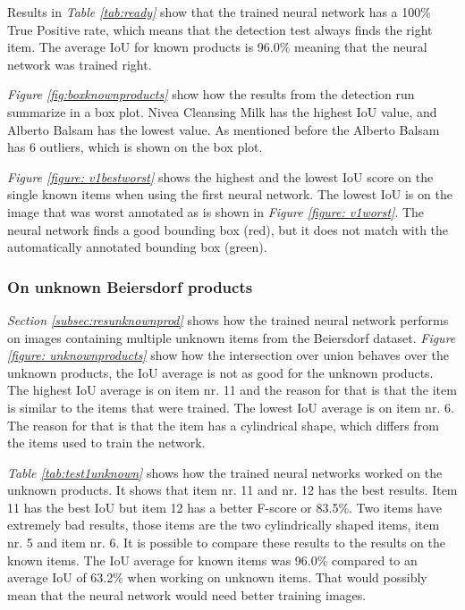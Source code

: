 Results in \textit{Table \ref{tab:ready}} show that the trained neural network has a 100\% True Positive rate, which means that the detection test always finds the right item. The average IoU for known products is 96.0\% meaning that the neural network was trained right.

\textit{Figure \ref{fig:boxknownproducts}} show how the results from the detection run summarize in a box plot. Nivea Cleansing Milk has the highest IoU value, and Alberto Balsam has the lowest value. As mentioned before the Alberto Balsam has 6 outliers, which is shown on the box plot.

\textit{Figure \ref{figure: v1bestworst}} shows the highest and the lowest IoU score on the single known items when using the first neural network. The lowest IoU is on the image that was worst annotated as is shown in \textit{Figure \ref{figure: v1worst}}. The neural network finds a good bounding box (red), but it does not match with the automatically annotated bounding box (green).

\subsubsection{On unknown Beiersdorf products}
\textit{Section \ref{subsec:resunknownprod}} shows how the trained neural network performs on images containing multiple unknown items from the Beiersdorf dataset. \textit{Figure \ref{figure: unknownproducts}} show how the intersection over union behaves over the unknown products, the IoU average is not as good for the unknown products. The highest IoU average is on item nr. 11 and the reason for that is that the item is similar to the items that were trained. The lowest IoU average is on item nr. 6. The reason for that is that the item has a cylindrical shape, which differs from the items used to train the network.

\textit{Table \ref{tab:test1unknown}} shows how the trained neural networks worked on the unknown products. It shows that item nr. 11 and nr. 12 has the best results. Item 11 has the best IoU but item 12 has a better F-score or 83.5\%. Two items have extremely bad results, those items are the two cylindrically shaped items, item nr. 5 and item nr. 6. It is possible to compare these results to the results on the known items. The IoU average for known items was 96.0\% compared to an average IoU of 63.2\% when working on unknown items. That would possibly mean that the neural network would need better training images. 

